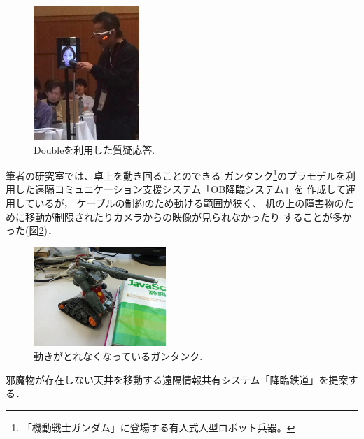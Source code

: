 \documentclass[submit,techreq]{ipsj}
\begin{document}
\begin{figure}[t]
\centerline{\includegraphics[width=40mm]{figures/b74f4564d4b38d12e48fcf80fef96def.png}}
\caption{Doubleを利用した質疑応答.}
\label{double}
\end{figure}

筆者の研究室では、卓上を動き回ることのできる
ガンタンク\footnote{
  「機動戦士ガンダム」に登場する有人式人型ロボット兵器。
}のプラモデルを利用した遠隔コミュニケーション支援システム「OB降臨システム」を
作成して運用しているが\cite{Hirota:Korin}，
ケーブルの制約のため動ける範囲が狭く、
机の上の障害物のために移動が制限されたりカメラからの映像が見られなかったり
することが多かった(図\ref{guntank})．

\begin{figure}[H]
\centerline{\includegraphics[width=50mm]{figures/1e8781bb2a5b28c8e06906d226c7505a.png}}
\caption{動きがとれなくなっているガンタンク.}
\label{guntank}
\end{figure}

邪魔物が存在しない天井を移動する遠隔情報共有システム「降臨鉄道」を提案する．



%
%
%
\end{document}
